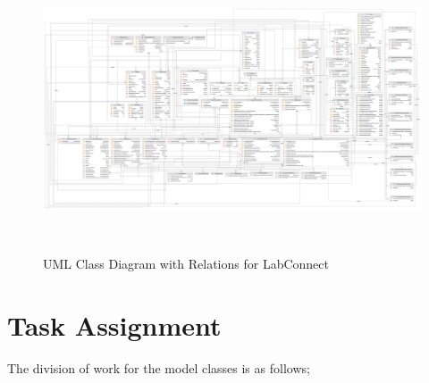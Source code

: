 \documentclass[a4paper, 12pt]{article}
\begin{document}
    \pagebreak

    \begin{landscape}
        \begin{figure}
            \centering
            \includegraphics[width=\dimexpr\paperheight-6cm\relax]{UML.jpg}
            \caption{UML Class Diagram with Relations for LabConnect}~\label{fig:class-diagram}
        \end{figure}
    \end{landscape}

    \pagebreak


    \section{Task Assignment}

    The division of work for the model classes is as follows;
\end{document}
